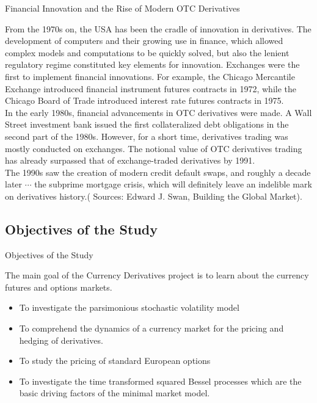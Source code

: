 \documentclass[unknownkeysallowed, compress]{beamer}
\theoremstyle{plain}
\begin{document}
\begin{frame}[allowframebreaks]{Financial Innovation and the Rise of Modern OTC Derivatives}

\noindent
\par From the 1970s on, the USA has been the cradle of innovation in derivatives. The
development of computers and their growing use in finance, which allowed complex
models and computations to be quickly solved, but also the lenient regulatory regime
constituted key elements for innovation. Exchanges were the first to implement financial
innovations. For example, the Chicago Mercantile Exchange introduced financial
instrument futures contracts in 1972, while the Chicago Board of Trade introduced
interest rate futures contracts in 1975.\\
In the early 1980s, financial advancements in OTC derivatives were made. A Wall Street
investment bank issued the first collateralized debt obligations in the second part of the
1980s. However, for a short time, derivatives trading was mostly conducted on
exchanges. The notional value of OTC derivatives trading has already surpassed that of
exchange-traded derivatives by 1991.\\
The 1990s saw the creation of modern credit default swaps, and roughly a decade later $\cdots$
the subprime mortgage crisis, which will definitely leave an indelible mark on derivatives
history.( Sources: Edward J. Swan, Building the Global Market).
\end{frame}

\subsection{Objectives of the Study}
\begin{frame}{Objectives of the Study}
\noindent 
\par The main goal of the Currency Derivatives project is to learn about the currency futures
and options markets.
\begin{itemize}
\item To investigate the parsimonious stochastic volatility model

\item To comprehend the dynamics of a currency market for the pricing and hedging of
derivatives.

\item To study the pricing of standard European options

\item To investigate the time transformed squared Bessel processes which are the basic
driving factors of the minimal market model.
\end{itemize}
\end{frame}
\end{document}
